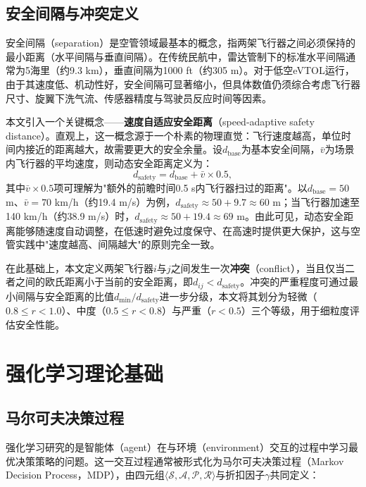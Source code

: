 \documentclass[12pt,a4paper,UTF8]{ctexbook}
\begin{document}
\subsection{安全间隔与冲突定义}

安全间隔（separation）是空管领域最基本的概念，指两架飞行器之间必须保持的最小距离（水平间隔与垂直间隔）。在传统民航中，雷达管制下的标准水平间隔通常为5海里（约9.3 km），垂直间隔为1000 ft（约305 m）。对于低空eVTOL运行，由于其速度低、机动性好，安全间隔可显著缩小，但具体数值仍须综合考虑飞行器尺寸、旋翼下洗气流、传感器精度与驾驶员反应时间等因素。

本文引入一个关键概念——\textbf{速度自适应安全距离}（speed-adaptive safety distance）。直观上，这一概念源于一个朴素的物理直觉：飞行速度越高，单位时间内接近的距离越大，故需要更大的安全余量。设$d_{\text{base}}$为基本安全间隔，$\bar{v}$为场景内飞行器的平均速度，则动态安全距离定义为：
\begin{equation}
    d_{\text{safety}} = d_{\text{base}} + \bar{v} \times 0.5,
    \label{eq:safety_distance}
\end{equation}
其中$\bar{v}\times0.5$项可理解为"额外的前瞻时间0.5 s内飞行器扫过的距离"。以$d_{\text{base}}=50$ m、$\bar{v}=70$ km/h（约19.4 m/s）为例，$d_{\text{safety}}\approx50+9.7\approx60$ m；当飞行器加速至140 km/h（约38.9 m/s）时，$d_{\text{safety}}\approx50+19.4\approx69$ m。由此可见，动态安全距离能够随速度自动调整，在低速时避免过度保守、在高速时提供更大保护，这与空管实践中"速度越高、间隔越大"的原则完全一致。

在此基础上，本文定义两架飞行器$i$与$j$之间发生一次\textbf{冲突}（conflict），当且仅当二者之间的欧氏距离小于当前的安全距离，即$d_{ij}<d_{\text{safety}}$。冲突的严重程度可通过最小间隔与安全距离的比值$d_{\min}/d_{\text{safety}}$进一步分级，本文将其划分为轻微（$0.8\leq r<1.0$）、中度（$0.5\leq r<0.8$）与严重（$r<0.5$）三个等级，用于细粒度评估安全性能。

\section{强化学习理论基础}

\subsection{马尔可夫决策过程}

强化学习研究的是智能体（agent）在与环境（environment）交互的过程中学习最优决策策略的问题。这一交互过程通常被形式化为马尔可夫决策过程（Markov Decision Process，MDP），由四元组$\langle\mathcal{S},\mathcal{A},\mathcal{P},\mathcal{R}\rangle$与折扣因子$\gamma$共同定义：
\end{document}
